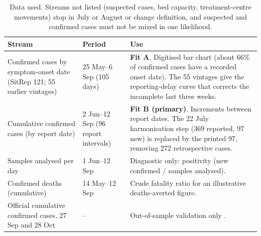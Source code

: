 \documentclass[11pt,a4paper]{article}
\begin{document}
\begin{table}[H]\centering\small
\caption{Data used. Streams not listed (suspected cases, bed capacity, treatment-centre movements) stop in July or August or change definition, and suspected and confirmed cases must not be mixed in one likelihood.}\label{tab:data}
\begin{tabular}{@{}p{3.5cm}p{2.7cm}p{8.3cm}@{}}\toprule
Stream & Period & Use \\\midrule
Confirmed cases by symptom-onset date (SitRep 121; 55 earlier vintages) & 25 May--6 Sep (105 days) & \textbf{Fit A}. Digitised bar chart (about 66\% of confirmed cases have a recorded onset date). The 55 vintages give the reporting-delay curve that corrects the incomplete last three weeks. \\
Cumulative confirmed cases (by report date) & 2 Jun--12 Sep (96 report intervals) & \textbf{Fit B (primary)}. Increments between report dates. The 22 July harmonisation step (369 reported, 97 new) is replaced by the printed 97, removing 272 retrospective cases. \\
Samples analysed per day & 1 Jun--12 Sep & Diagnostic only: positivity (new confirmed / samples analysed). \\
Confirmed deaths (cumulative) & 14 May--12 Sep & Crude fatality ratio for an illustrative deaths-averted figure. \\
Official cumulative confirmed cases, 27 Sep and 28 Oct & -- & Out-of-sample validation only \citep{ukhsa2026,cdcsituation2026}. \\\bottomrule
\end{tabular}\end{table}
\end{document}
